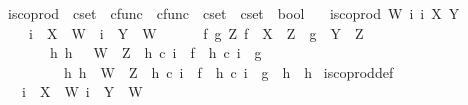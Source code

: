 \begin{isabellebody}
\isanewline
{}\isamarkupfalse%
\ is{\isacharunderscore}{\kern0pt}coprod\ {\isacharcolon}{\kern0pt}{\isacharcolon}{\kern0pt}\ {\isachardoublequoteopen}cset\ {\isasymRightarrow}\ cfunc\ {\isasymRightarrow}\ cfunc\ {\isasymRightarrow}\ cset\ {\isasymRightarrow}\ cset\ {\isasymRightarrow}\ bool{\isachardoublequoteclose}\ \isanewline
\ \ {\isachardoublequoteopen}is{\isacharunderscore}{\kern0pt}coprod\ W\ i\ i\ X\ Y\ {\isasymlongleftrightarrow}\ \isanewline
\ \ \ \ {\isacharparenleft}{\kern0pt}i\ {\isacharcolon}{\kern0pt}\ X\ {\isasymrightarrow}\ W\ {\isasymand}\ i\ {\isacharcolon}{\kern0pt}\ Y\ {\isasymrightarrow}\ W\ {\isasymand}\isanewline
\ \ \ \ {\isacharparenleft}{\kern0pt}{\isasymforall}\ f\ g\ Z{\isachardot}{\kern0pt}\ {\isacharparenleft}{\kern0pt}f\ {\isacharcolon}{\kern0pt}\ X\ {\isasymrightarrow}\ Z\ {\isasymand}\ g\ {\isacharcolon}{\kern0pt}\ Y\ {\isasymrightarrow}\ Z{\isacharparenright}{\kern0pt}\ {\isasymlongrightarrow}\ \isanewline
\ \ \ \ \ \ {\isacharparenleft}{\kern0pt}{\isasymexists}\ h{\isachardot}{\kern0pt}\ h\ {\isacharcolon}{\kern0pt}\ \ W\ {\isasymrightarrow}\ Z\ {\isasymand}\ h\ {\isasymcirc}\isactrlsub c\ i\ {\isacharequal}{\kern0pt}\ f\ {\isasymand}\ h\ {\isasymcirc}\isactrlsub c\ i\ {\isacharequal}{\kern0pt}\ g\ {\isasymand}\isanewline
\ \ \ \ \ \ \ \ {\isacharparenleft}{\kern0pt}{\isasymforall}\ h{}{\isachardot}{\kern0pt}\ {\isacharparenleft}{\kern0pt}h{}\ {\isacharcolon}{\kern0pt}\ W\ {\isasymrightarrow}\ Z\ {\isasymand}\ h{}\ {\isasymcirc}\isactrlsub c\ i\ {\isacharequal}{\kern0pt}\ f\ {\isasymand}\ h{}\ {\isasymcirc}\isactrlsub c\ i\ {\isacharequal}{\kern0pt}\ g{\isacharparenright}{\kern0pt}\ {\isasymlongrightarrow}\ h{}\ {\isacharequal}{\kern0pt}\ h{\isacharparenright}{\kern0pt}{\isacharparenright}{\kern0pt}{\isacharparenright}{\kern0pt}{\isacharparenright}{\kern0pt}{\isachardoublequoteclose}\isanewline
\isanewline
{}\isamarkupfalse%
\ is{\isacharunderscore}{\kern0pt}coprod{\isacharunderscore}{\kern0pt}def{}{\isacharcolon}{\kern0pt}\isanewline
\ \ \ {\isachardoublequoteopen}i\ {\isacharcolon}{\kern0pt}\ X\ {\isasymrightarrow}\ W{\isachardoublequoteclose}\ {\isachardoublequoteopen}i\ {\isacharcolon}{\kern0pt}\ Y\ {\isasymrightarrow}\ W{\isachardoublequoteclose}\isanewline

\end{isabellebody}
